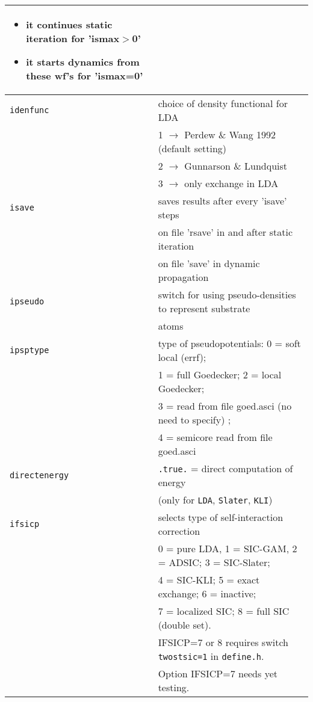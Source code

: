 \documentclass[11pt,a4paper]{article}
\begin{document}
\begin{table}[h]
\begin{tabular}{|p{3.5cm}|p{11.2cm}|}
					\begin{itemize}
						\item it continues static iteration for 'ismax$>$0'
						\item it starts dynamics from these wf's for 'ismax=0'
						\vspace{-3ex}
					\end{itemize}\\
					\hline
					\texttt{idenfunc} & choice of density functional for LDA\\
						& 1 $\rightarrow$ Perdew \& Wang 1992 (default setting)\\
						& 2 $\rightarrow$ Gunnarson \& Lundquist\\
						& 3 $\rightarrow$ only exchange in  LDA \\
					\hline
					\texttt{isave}& saves results after every 'isave' steps \\
					\texttt{}& on file 'rsave' in and after static iteration\\
					\texttt{}& on file 'save' in dynamic propagation\\
					\hline
					\texttt{ipseudo}& switch for using pseudo-densities to represent substrate\\
					\texttt{}& atoms \\
					\hline
					\texttt{ipsptype}& type of pseudopotentials: 0 = soft local (errf);\\
						& 1 = full Goedecker; 2 = local Goedecker;\\
						& 3 = read from file goed.asci (no need to specify)  ;\\
						& 4 = semicore read from file goed.asci\\
					\hline
					\texttt{directenergy}   & \texttt{.true.} = direct computation of energy \\
						& (only for \texttt{LDA}, \texttt{Slater}, \texttt{KLI})\\
					\hline
					\texttt{ifsicp}& selects type of self-interaction correction\\
						&  0 = pure LDA, 1 = SIC-GAM, 2 = ADSIC; 3 = SIC-Slater; \\
						&  4 = SIC-KLI; 5 = exact exchange; 6 = inactive;\\
						&  7 = localized SIC;  8 = full SIC (double set).\\
						& IFSICP=7 or 8 requires switch \texttt{twostsic=1} in \texttt{define.h}.\\
						& Option IFSICP=7 needs yet testing.\\

\end{tabular}
\end{table}
\end{document}
